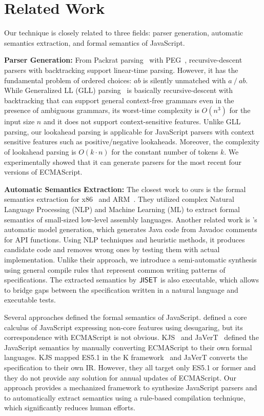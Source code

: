 \section{Related Work}\label{sec:related}
Our technique is closely related to three fields: parser generation,
automatic semantics extraction, and formal semantics of JavaScript.

\textbf{Parser Generation:} From Packrat parsing~\cite{packrat} with
PEG~\cite{peg}, recursive-descent
parsers with backtracking support linear-time parsing.  However, it
has the fundamental problem of ordered choices: \( ab \) is silently
unmatched with \( a ~/~ ab \).  While Generalized LL (GLL) parsing~\cite{gll}
is basically recursive-descent with backtracking that can support general
context-free grammars even in the presence of ambiguous grammars,
its worst-time complexity is \( O(n^3) \) for the input size \( n \) and it
does not support context-sensitive features.  Unlike GLL parsing, our lookahead
parsing is applicable for JavaScript parsers with context sensitive features
such as positive/negative lookaheads. Moreover, the complexity of lookahead
parsing is \( O(k \cdot n) \) for the constant
number of tokens \( k \). We experimentally showed that it can generate parsers
for the most recent four versions of ECMAScript.

\textbf{Automatic Semantics Extraction:} The closest work to ours is the formal
semantics extraction for x86~\cite{extract-x86} and ARM~\cite{extract-arm}.
They utilized complex Natural Language Processing (NLP) and Machine Learning
(ML) to extract formal semantics of small-sized low-level assembly languages.
Another related work is \citet{javadoc}'s automatic model generation, which
generates Java code from Javadoc comments for API functions.  Using NLP techniques
and heuristic methods, it produces candidate code and removes wrong ones
by testing them with actual implementation. Unlike their approach, we
introduce a semi-automatic synthesis using general compile rules that
represent common writing patterns of specifications.  The extracted
semantics by \(\text{\sf JISET}\) is also executable, which allows to bridge gaps
between the specification written in a natural language and executable
tests.

Several approaches defined the formal semantics of JavaScript.
\citet{lambdajs} defined a core calculus of JavaScript expressing non-core
features using desugaring, but its correspondence with ECMAScript is
not obvious.
KJS~\cite{kjs} and JaVerT~\cite{javert} defined the JavaScript semantics
by manually converting ECMAScript to their own formal languages.  KJS mapped
ES5.1 in the K framework~\cite{kframework} and JaVerT converts the
specification to their own IR.  However, they all target only ES5.1 or former and
they do not provide any solution for annual updates of ECMAScript. Our approach
provides a mechanized framework to synthesize JavaScript parsers and to
automatically extract semantics using a rule-based compilation technique, which
significantly reduces human efforts.

